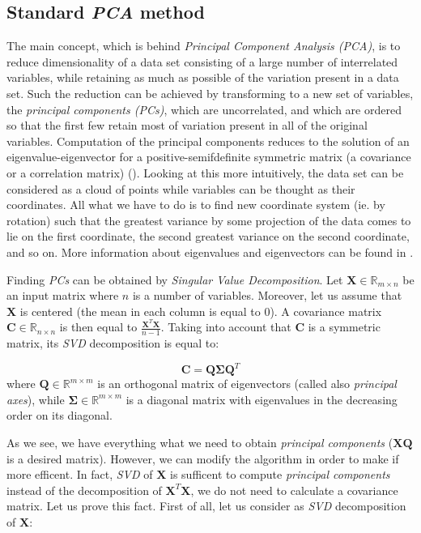 \subsection{Standard \textit{PCA} method}

The main concept, which is behind \textit{Principal Component Analysis (PCA)}, is to reduce dimensionality of a data set consisting of a large number of interrelated variables, while retaining as much as possible of the variation present in a data set. Such the reduction can be achieved by transforming to a new set of variables, the \textit{principal components (PCs)}, which are uncorrelated, and which are ordered so that the first few retain most of variation present in all of the original variables. Computation of the principal components reduces to the solution of an eigenvalue-eigenvector for a positive-semifdefinite symmetric matrix (a covariance or a correlation matrix) (\cite{Jolliffe}). Looking at this more intuitively, the data set can be considered as a cloud of points while variables can be thought as their coordinates. All what we have to do is to find new coordinate system (ie. by rotation) such that the greatest variance by some projection of the data comes to lie on the first coordinate, the second greatest variance on the second coordinate, and so on. More information about eigenvalues and eigenvectors can be found in . 

Finding \textit{PCs} can be obtained by \textit{Singular Value Decomposition}. Let $\boldsymbol{X} \in \mathbb{R}_{m \times n}$ be an input matrix where $n$ is a number of variables. Moreover, let us assume that $\boldsymbol{X}$ is centered (the mean in each column is equal to $0$). A covariance matrix $\boldsymbol{C} \in \mathbb{R}_{n \times n}$ is then equal to $\frac{\boldsymbol{X}^T\boldsymbol{X}}{n-1}$. Taking into account that $\boldsymbol{C}$ is a symmetric matrix, its \textit{SVD} decomposition is equal to:

\begin{equation}\label{eq:pca1}
    \boldsymbol{C}=\boldsymbol{Q}\boldsymbol{\Sigma}{\boldsymbol{Q}^T}
\end{equation}
where $\boldsymbol{Q} \in \mathbb{R}^{m \times m}$ is an orthogonal matrix of eigenvectors (called also \textit{principal axes}), while $\boldsymbol{\Sigma} \in \mathbb{R}^{m \times m}$ is a diagonal matrix with eigenvalues in the decreasing order on its diagonal. 

As we see, we have everything what we need to obtain \textit{principal components} ($\boldsymbol{X}\boldsymbol{Q}$ is a desired matrix). However, we can modify the algorithm in order to make if more efficent. In fact, \textit{SVD} of $\boldsymbol{X}$ is sufficent to compute \textit{principal components} instead of the decomposition of $\boldsymbol{X}^T\boldsymbol{X}$, we do not need to calculate a covariance matrix. Let us prove this fact. First of all, let us consider as \textit{SVD} decomposition of $\boldsymbol{X}$:

